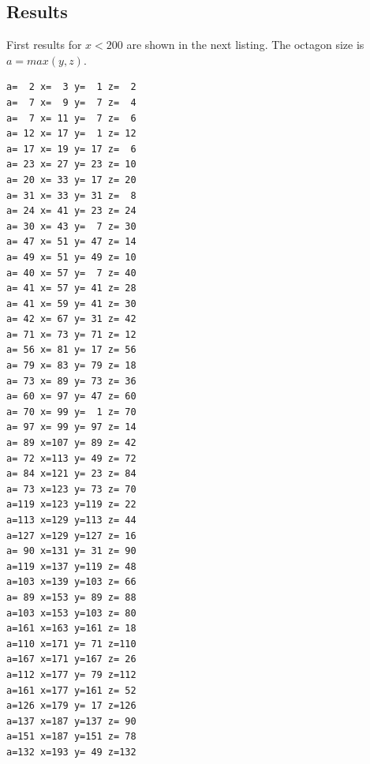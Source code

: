 \documentclass[11pt]{article}
\begin{document}
\subsection{Results}
First results for $x < 200$ are shown in the next listing.
The octagon size is $a = max(y,z)$.
\setlength{\columnsep}{100pt}
\begin{multicols}{2}
\begin{lstlisting}
a=  2 x=  3 y=  1 z=  2
a=  7 x=  9 y=  7 z=  4
a=  7 x= 11 y=  7 z=  6
a= 12 x= 17 y=  1 z= 12
a= 17 x= 19 y= 17 z=  6
a= 23 x= 27 y= 23 z= 10
a= 20 x= 33 y= 17 z= 20
a= 31 x= 33 y= 31 z=  8
a= 24 x= 41 y= 23 z= 24
a= 30 x= 43 y=  7 z= 30
a= 47 x= 51 y= 47 z= 14
a= 49 x= 51 y= 49 z= 10
a= 40 x= 57 y=  7 z= 40
a= 41 x= 57 y= 41 z= 28
a= 41 x= 59 y= 41 z= 30
a= 42 x= 67 y= 31 z= 42
a= 71 x= 73 y= 71 z= 12
a= 56 x= 81 y= 17 z= 56
a= 79 x= 83 y= 79 z= 18
a= 73 x= 89 y= 73 z= 36
a= 60 x= 97 y= 47 z= 60
a= 70 x= 99 y=  1 z= 70
a= 97 x= 99 y= 97 z= 14
a= 89 x=107 y= 89 z= 42
a= 72 x=113 y= 49 z= 72
a= 84 x=121 y= 23 z= 84
a= 73 x=123 y= 73 z= 70
a=119 x=123 y=119 z= 22
a=113 x=129 y=113 z= 44
a=127 x=129 y=127 z= 16
a= 90 x=131 y= 31 z= 90
a=119 x=137 y=119 z= 48
a=103 x=139 y=103 z= 66
a= 89 x=153 y= 89 z= 88
a=103 x=153 y=103 z= 80
a=161 x=163 y=161 z= 18
a=110 x=171 y= 71 z=110
a=167 x=171 y=167 z= 26
a=112 x=177 y= 79 z=112
a=161 x=177 y=161 z= 52
a=126 x=179 y= 17 z=126
a=137 x=187 y=137 z= 90
a=151 x=187 y=151 z= 78
a=132 x=193 y= 49 z=132
\end{lstlisting}
\end{multicols}

\newcommand{\fixer}[6] %
{
 \begin{scope}[shift={(#1*#6,0)}]
  \begin{scope}[rotate=90]
   \meccanostrip[000000]{#3}{#1}{#2}
   \begin{scope}[shift={(4*#1,0)},rotate=-143]
    \meccanostrip[0033FF]{5}{#1}{#2}
   \end{scope} 
   \begin{scope}[shift={(#1*#3,0)},rotate=-135+#5]
    \meccanostrip[FF3300]{#4}{#1}{#2}
   \end{scope} 
  \end{scope}
 \end{scope}
}
\end{document}
